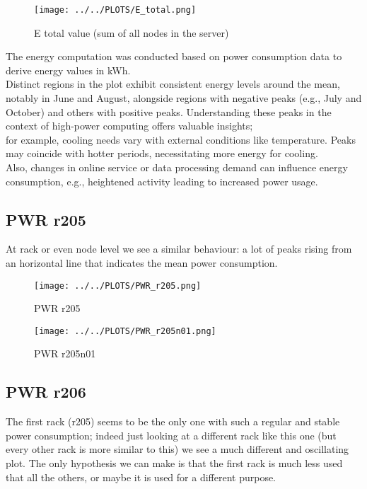 \begin{figure}[H]
\centering
\texttt{[image: ../../PLOTS/E\_total.png]}
\captionsetup{skip=-10pt}
\caption{E total value (sum of all nodes in the server)}
\label{fig:E_total}
\end{figure}

The energy computation was conducted based on power consumption data to derive energy values in kWh. \\
Distinct regions in the plot exhibit consistent energy levels around the mean, notably in June and August, alongside regions with negative peaks (e.g., July and October) and others with positive peaks. Understanding these peaks in the context of high-power computing offers valuable insights; \\
for example, cooling needs vary with external conditions like temperature. Peaks may coincide with hotter periods, necessitating more energy for cooling. \\
Also, changes in online service or data processing demand can influence energy consumption, e.g., heightened activity leading to increased power usage.

\subsection{PWR r205}
At rack or even node level we see a similar behaviour: a lot of peaks rising from an horizontal line that indicates the mean power consumption. 

\vspace{-15pt}

\begin{figure}[H]
\centering
\texttt{[image: ../../PLOTS/PWR\_r205.png]}
\captionsetup{skip=-10pt}
\caption{PWR r205}
\label{fig:PWR_r205}
\end{figure}

\vspace{-20pt}

\begin{figure}[H]
\centering
\texttt{[image: ../../PLOTS/PWR\_r205n01.png]}
\captionsetup{skip=-10pt}
\caption{PWR r205n01}
\label{fig:PWR_r205n01}
\end{figure}

\subsection{PWR r206}
The first rack (r205) seems to be the only one with such a regular and stable power consumption; indeed just looking at a different rack like this one (but every other rack is more similar to this) we see a much different and oscillating plot. The only hypothesis we can make is that the first rack is much less used that all the others, or maybe it is used for a different purpose.


